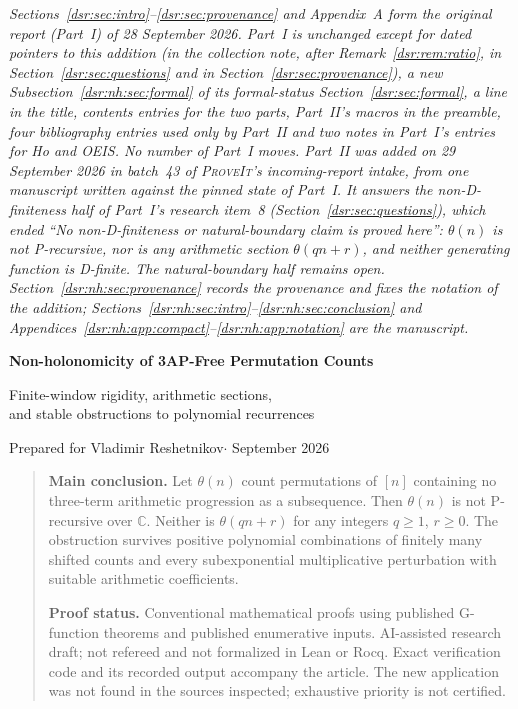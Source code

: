 \documentclass[11pt,a4paper]{article}
\numberwithin{equation}{section}
\theoremstyle{definition}
\theoremstyle{remark}
\newcommand{\repo}{\textsc{ProveIt}}
\newcommand{\C}{\mathbb C}
\newcommand{\tht}{\theta}
\theoremstyle{definition}
\theoremstyle{plain}
\begin{document}
\noindent\emph{Sections~\ref{dsr:sec:intro}--\ref{dsr:sec:provenance}
and Appendix~A form the original report (Part~I)
of 28 September 2026. Part~I is unchanged except for dated pointers to
this addition (in the collection note, after
Remark~\ref{dsr:rem:ratio}, in Section~\ref{dsr:sec:questions} and in
Section~\ref{dsr:sec:provenance}), a
new Subsection~\ref{dsr:nh:sec:formal} of its formal-status
Section~\ref{dsr:sec:formal}, a line in the title, contents entries for the
two parts, Part~II's macros in the preamble, four bibliography entries used
only by Part~II and two notes in Part~I's entries for Ho and OEIS. No
number of Part~I moves. Part~II was added on 29 September 2026 in batch~43 of
\textup{\repo}'s incoming-report intake, from one manuscript written against the
pinned state of Part~I. It answers the non-D-finiteness half of Part~I's
research item~8 (Section~\ref{dsr:sec:questions}), which ended ``No
non-D-finiteness or natural-boundary claim is proved here'': $\theta(n)$ is
not P-recursive, nor is any arithmetic section $\theta(qn+r)$, and neither
generating function is D-finite. The natural-boundary half remains open.
Section~\ref{dsr:nh:sec:provenance} records the provenance and fixes the
notation of the addition; Sections~\ref{dsr:nh:sec:intro}--\ref{dsr:nh:sec:conclusion}
and Appendices~\ref{dsr:nh:app:compact}--\ref{dsr:nh:app:notation} are the
manuscript.}

\medskip
\begin{center}
{\Large\bfseries Non-holonomicity of 3AP-Free Permutation Counts\par}
\medskip
{\large Finite-window rigidity, arithmetic sections,\\
and stable obstructions to polynomial recurrences\par}
\medskip
Prepared for Vladimir Reshetnikov\quad$\cdot$ September 2026
\end{center}

\begin{quote}
\textbf{Main conclusion.}
Let $\tht(n)$ count permutations of $[n]$ containing no three-term
arithmetic progression as a subsequence. Then $\tht(n)$ is not
P-recursive over $\C$. Neither is $\tht(qn+r)$ for any integers
$q\ge1$, $r\ge0$. The obstruction survives positive polynomial
combinations of finitely many shifted counts and every
subexponential multiplicative perturbation with suitable arithmetic
coefficients.

\smallskip
\textbf{Proof status.} Conventional mathematical proofs using published
G-function theorems and published enumerative inputs. AI-assisted research
draft; not refereed and not formalized in Lean or Rocq. Exact verification
code and its recorded output accompany the article. The new application
was not found in the sources inspected; exhaustive priority is not certified.
\end{quote}
\end{document}
